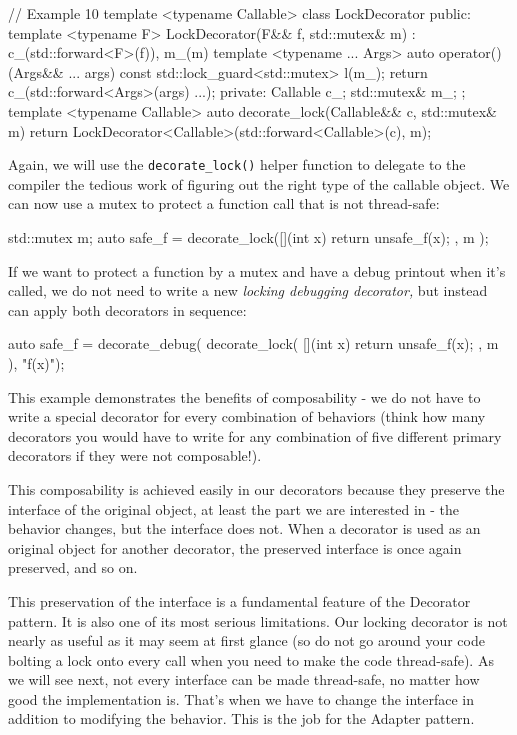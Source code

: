 \begin{code}
// Example 10
template <typename Callable> class LockDecorator {
  public:
  template <typename F>
  LockDecorator(F&& f, std::mutex& m) :
    c_(std::forward<F>(f)), m_(m) {}
  template <typename ... Args>
  auto operator()(Args&& ... args) const {
    std::lock_guard<std::mutex> l(m_);
    return c_(std::forward<Args>(args) ...);
  }
  private:
  Callable c_;
  std::mutex& m_;
};
template <typename Callable>
auto decorate_lock(Callable&& c, std::mutex& m) {
  return
    LockDecorator<Callable>(std::forward<Callable>(c), m);
}
\end{code}

Again, we will use the \texttt{decorate\_lock()} helper function to delegate to the compiler the tedious work of figuring out the right type of the callable object. We can now use a mutex to protect a function call that is not thread-safe:

\begin{code}
std::mutex m;
auto safe_f = decorate_lock([](int x) {
  return unsafe_f(x); }, m
);
\end{code}

If we want to protect a function by a mutex and have a debug printout when it's called, we do not need to write a new \emph{locking debugging decorator,} but instead can apply both decorators in sequence:

\begin{code}
auto safe_f = decorate_debug(
  decorate_lock(
    [](int x) { return unsafe_f(x); },
    m
  ),
  "f(x)");
\end{code}

This example demonstrates the benefits of composability - we do not have to write a special decorator for every combination of behaviors (think how many decorators you would have to write for any combination of five different primary decorators if they were not composable!).

This composability is achieved easily in our decorators because they preserve the interface of the original object, at least the part we are interested in - the behavior changes, but the interface does not. When a decorator is used as an original object for another decorator, the preserved interface is once again preserved, and so on.

This preservation of the interface is a fundamental feature of the Decorator pattern. It is also one of its most serious limitations. Our locking decorator is not nearly as useful as it may seem at first glance (so do not go around your code bolting a lock onto every call when you need to make the code thread-safe). As we will see next, not every interface can be made thread-safe, no matter how good the implementation is. That's when we have to change the interface in addition to modifying the behavior. This is the job for the Adapter pattern.

